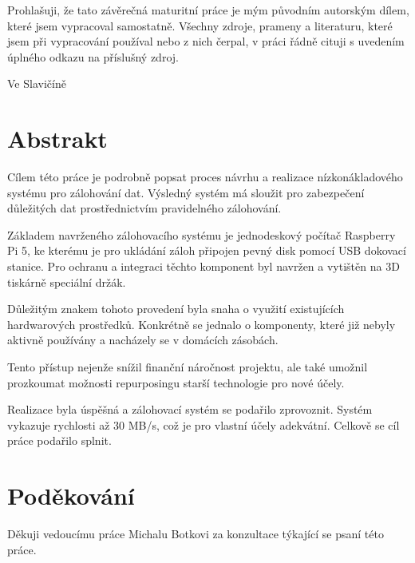 \documentclass[a4paper,12pt, oneside]{book}
\makeatletter
\let\newauthor\@author
\let\newdate\@date
\makeatother
\begin{document}
\newpage
\mbox{}
\newpage


\noindent

Prohlašuji, že tato závěrečná maturitní práce je mým původním autorským dílem,
které jsem vypracoval samostatně. Všechny zdroje, prameny a literaturu, které
jsem při vypracování používal nebo z nich čerpal, v práci řádně cituji
s uvedením úplného odkazu na příslušný zdroj.

\begin{center}
Ve Slavičíně

\newdate

\vspace{10mm}

\newauthor
\end{center}

\newpage
\section*{Abstrakt}

Cílem této práce je podrobně popsat proces návrhu a realizace nízkonákladového
systému pro zálohování dat.  Výsledný systém má sloužit pro zabezpečení důležitých
dat prostřednictvím pravidelného zálohování.

Základem navrženého zálohovacího systému je jednodeskový počítač Raspberry Pi 5,
ke kterému je pro ukládání záloh připojen pevný disk pomocí USB
dokovací stanice. Pro ochranu a integraci těchto komponent byl navržen a
vytištěn na 3D tiskárně speciální držák. 

Důležitým znakem tohoto provedení byla snaha o využití existujících
hardwarových prostředků. Konkrétně se jednalo o komponenty, které již nebyly
aktivně používány a nacházely se v domácích zásobách.

Tento přístup nejenže snížil finanční náročnost projektu, ale také umožnil
prozkoumat možnosti repurposingu starší technologie pro nové účely.

Realizace byla úspěšná a zálohovací systém se podařilo zprovoznit. Systém
vykazuje rychlosti až 30 MB/s, což je pro vlastní účely adekvátní. Celkově 
se cíl práce podařilo splnit.

\newpage
\section*{Poděkování}

Děkuji vedoucímu práce Michalu Botkovi za konzultace týkající 
se psaní této práce. 
\end{document}
